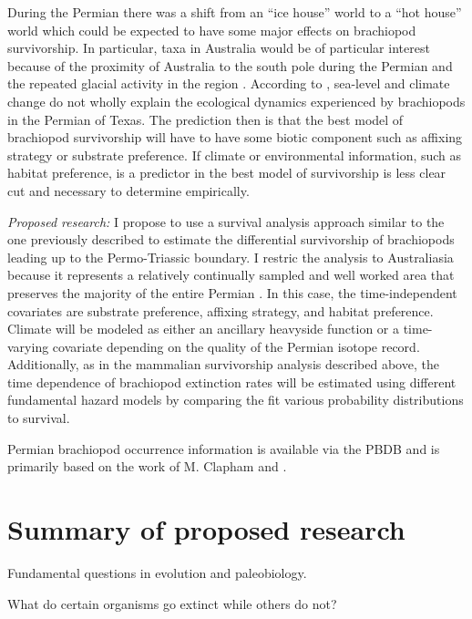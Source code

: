 \documentclass[12pt,letterpaper]{article}
\begin{document}
During the Permian there was a shift from an ``ice house'' world to a ``hot house'' world \citep{Fielding2006,Birgenheier2010,Jones2006,Powell2007} which could be expected to have some major effects on brachiopod survivorship. In particular, taxa in Australia would be of particular interest because of the proximity of Australia to the south pole during the Permian and the repeated glacial activity in the region \citep{Fielding2006,Birgenheier2010,Jones2006}. According to \citet{Olszewski2004}, sea-level and climate change do not wholly explain the ecological dynamics experienced by brachiopods in the Permian of Texas. The prediction then is that the best model of brachiopod survivorship will have to have some biotic component such as affixing strategy or substrate preference. If climate or environmental information, such as habitat preference, is a predictor in the best model of survivorship is less clear cut and necessary to determine empirically.


\textit{Proposed research:}
I propose to use a survival analysis approach similar to the one previously described to estimate the differential survivorship of brachiopods leading up to the Permo-Triassic boundary. I restric the analysis to Australiasia because it represents a relatively continually sampled and well worked area that preserves the majority of the entire Permian \citep{Clapham2012,Clapham2008a,Waterhouse1987,Archbold1995}. In this case, the time-independent covariates are substrate preference, affixing strategy, and habitat preference. Climate will be modeled as either an ancillary heavyside function or a time-varying covariate depending on the quality of the Permian isotope record. Additionally, as in the mammalian survivorship analysis described above, the time dependence of brachiopod extinction rates will be estimated using different fundamental hazard models by comparing the fit various probability distributions to survival.

Permian brachiopod occurrence information is available via the PBDB and is primarily based on the work of M. Clapham \citep{Clapham2006,Clapham2008a,Clapham2007a,Clapham2012,Clapham2007} and \citet{Waterhouse1987}.


\section{Summary of proposed research}
Fundamental questions in evolution and paleobiology. 

What do certain organisms go extinct while others do not?
\end{document}
